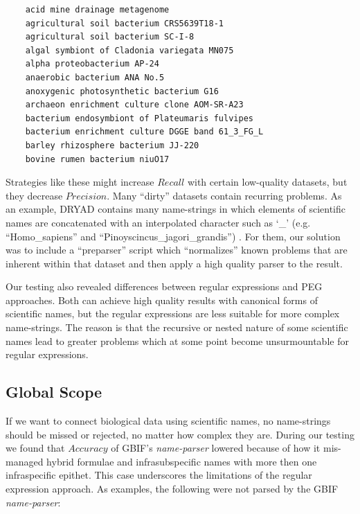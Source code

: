 \documentclass{bmcart}
\begin{document}
\begin{verbatim}
    acid mine drainage metagenome
    agricultural soil bacterium CRS5639T18-1
    agricultural soil bacterium SC-I-8
    algal symbiont of Cladonia variegata MN075
    alpha proteobacterium AP-24
    anaerobic bacterium ANA No.5
    anoxygenic photosynthetic bacterium G16
    archaeon enrichment culture clone AOM-SR-A23
    bacterium endosymbiont of Plateumaris fulvipes
    bacterium enrichment culture DGGE band 61_3_FG_L
    barley rhizosphere bacterium JJ-220
    bovine rumen bacterium niuO17
\end{verbatim}

\vspace{0.5cm}

Strategies like these might increase $Recall$ with certain low-quality datasets, but they decrease $Precision$. Many ``dirty'' datasets contain recurring problems. As an example, DRYAD contains many name-strings in which elements of scientific names are concatenated with an interpolated character such as `\_’ (e.g. ``Homo\_sapiens'' and ``Pinoyscincus\_jagori\_grandis'') \cite{Patterson2016}. For them, our solution was to include a ``preparser'' script which ``normalizes'' known problems that are inherent within that dataset and then apply a high quality parser to the result.

Our testing also revealed differences between regular expressions and PEG approaches. Both can achieve high quality results with canonical forms of scientific names, but the regular expressions are less suitable for more complex name-strings. The reason is that the recursive or nested nature of some scientific names lead to greater problems which at some point become unsurmountable for regular expressions.

\subsection*{Global Scope}

If we want to connect biological data using scientific names, no name-strings should be missed or rejected, no matter how complex they are. During our testing we found that $Accuracy$ of GBIF's \textit{name-parser} lowered because of how it mis-managed  hybrid formulae and infrasubspecific names with more then one infraspecific epithet. This case underscores the limitations of the regular expression approach. As examples, the following were not parsed by the GBIF \textit{name-parser}:

\vspace{0.5cm}
\end{document}
